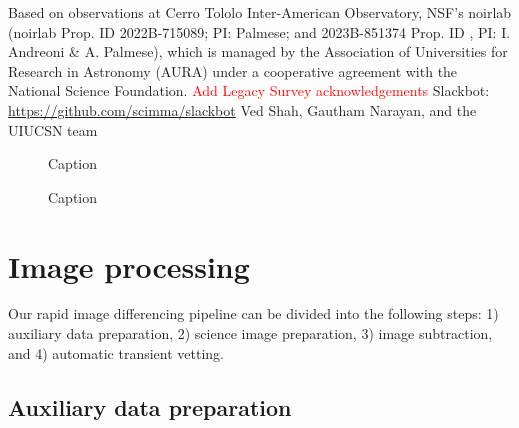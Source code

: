 \documentclass[twocolumn]{aastex631}
\begin{document}
\begin{acknowledgements}
Based on observations at Cerro Tololo Inter-American Observatory, NSF’s \gls{noirlab} (\gls{noirlab} Prop. ID 2022B-715089; PI: Palmese; and 2023B-851374 Prop. ID , PI: I. Andreoni \& A. Palmese), which is managed by the Association of Universities for Research in Astronomy (AURA) under a cooperative agreement with the National Science Foundation.
\textcolor{red}{Add Legacy Survey acknowledgements}
Slackbot: \url{https://github.com/scimma/slackbot} Ved Shah, Gautham Narayan, and the UIUCSN team

\end{acknowledgements}

\appendix

\begin{figure}
    \centering
    \caption{Caption}
    \label{fig:light_curves_other_1}
\end{figure}

\begin{figure}
    \centering
    \caption{Caption}
    \label{fig:light_curves_other_2}
\end{figure}

\section{Image processing}\label{sec:imgproc}

Our rapid image differencing pipeline can be divided into the following steps:
1) auxiliary data preparation, 2) science image preparation, 3) image subtraction, and 4) automatic transient vetting.

\subsection{Auxiliary data preparation}\label{subsec:auxdataprep}
\end{document}
